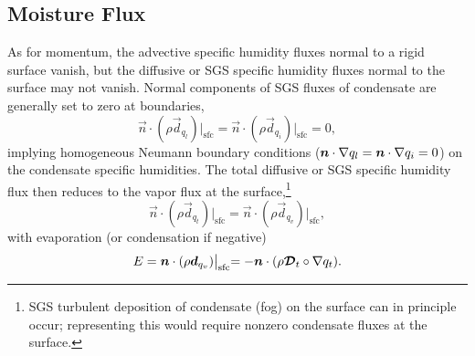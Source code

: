 \documentclass{report}
\begin{document}
\subsection{Moisture Flux}\label{s:bc_moisture_flux}

As for momentum, the advective specific humidity fluxes normal to a rigid surface vanish, but the diffusive or SGS specific humidity fluxes normal to the surface may not vanish. Normal components of SGS fluxes of condensate are generally set to zero at boundaries,
\begin{equation}\label{e:sfc_condensate_flux}
\vec{n} \cdot (\rho \vec{d}_{q_{l}})\bigl|_\mathrm{sfc} = \vec{n} \cdot (\rho \vec{d}_{q_{i}})\bigl|_\mathrm{sfc} = 0,
\end{equation}
implying homogeneous Neumann boundary conditions ($\boldsymbol{{n}}\cdot\nabla q_l = \boldsymbol{{n}}\cdot\nabla q_i = 0$) on the condensate specific humidities. The total diffusive or SGS specific humidity flux then reduces to the vapor flux at the surface,\footnote{SGS turbulent deposition of condensate (fog) on the surface can in principle occur; representing this would require nonzero condensate fluxes at the surface.}
\[
\vec{n} \cdot (\rho \vec{d}_{q_{t}})\bigl|_\mathrm{sfc} = \vec{n} \cdot (\rho \vec{d}_{q_{v}})\bigl|_\mathrm{sfc},
\]
with evaporation (or condensation if negative)
\[
E = \boldsymbol{{n}} \cdot (\rho \boldsymbol{{d}}_{q_{v}})\bigl|_\mathrm{sfc} = -\boldsymbol{{n}} \cdot (\rho \boldsymbol{{\mathcal{D}}}_t \circ \nabla q_t).
\]
\end{document}
